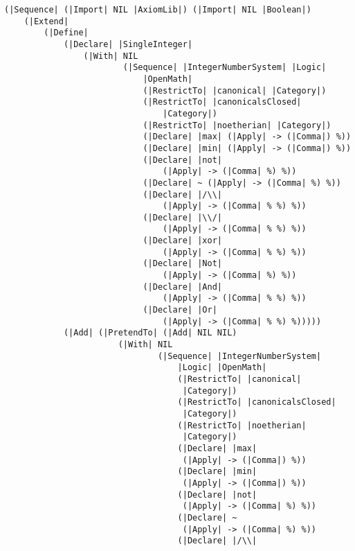 \documentclass{article}
\begin{document}
\begin{verbatim}
(|Sequence| (|Import| NIL |AxiomLib|) (|Import| NIL |Boolean|)
    (|Extend|
        (|Define|
            (|Declare| |SingleInteger|
                (|With| NIL
                        (|Sequence| |IntegerNumberSystem| |Logic|
                            |OpenMath|
                            (|RestrictTo| |canonical| |Category|)
                            (|RestrictTo| |canonicalsClosed|
                                |Category|)
                            (|RestrictTo| |noetherian| |Category|)
                            (|Declare| |max| (|Apply| -> (|Comma|) %))
                            (|Declare| |min| (|Apply| -> (|Comma|) %))
                            (|Declare| |not|
                                (|Apply| -> (|Comma| %) %))
                            (|Declare| ~ (|Apply| -> (|Comma| %) %))
                            (|Declare| |/\\|
                                (|Apply| -> (|Comma| % %) %))
                            (|Declare| |\\/|
                                (|Apply| -> (|Comma| % %) %))
                            (|Declare| |xor|
                                (|Apply| -> (|Comma| % %) %))
                            (|Declare| |Not|
                                (|Apply| -> (|Comma| %) %))
                            (|Declare| |And|
                                (|Apply| -> (|Comma| % %) %))
                            (|Declare| |Or|
                                (|Apply| -> (|Comma| % %) %)))))
            (|Add| (|PretendTo| (|Add| NIL NIL)
                       (|With| NIL
                               (|Sequence| |IntegerNumberSystem|
                                   |Logic| |OpenMath|
                                   (|RestrictTo| |canonical|
                                    |Category|)
                                   (|RestrictTo| |canonicalsClosed|
                                    |Category|)
                                   (|RestrictTo| |noetherian|
                                    |Category|)
                                   (|Declare| |max|
                                    (|Apply| -> (|Comma|) %))
                                   (|Declare| |min|
                                    (|Apply| -> (|Comma|) %))
                                   (|Declare| |not|
                                    (|Apply| -> (|Comma| %) %))
                                   (|Declare| ~
                                    (|Apply| -> (|Comma| %) %))
                                   (|Declare| |/\\|

\end{verbatim}
\end{document}
